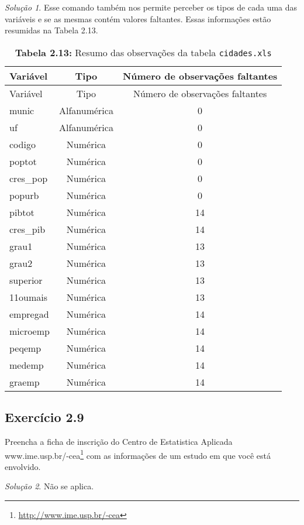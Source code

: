 \documentclass[
]{latex/krantz}
\renewcommand{\href}[2]{#2\footnote{\url{#1}}}
\theoremstyle{definition}
\theoremstyle{definition}
\theoremstyle{definition}
\theoremstyle{definition}
\theoremstyle{remark}
\newtheorem*{solution}{Solução}
\begin{document}
\begin{solution}
Esse comando também nos permite perceber os tipos de cada uma das variáveis e se as mesmas contém valores faltantes. Essas informações estão resumidas na Tabela 2.13.

\begin{longtable}[]{@{}lcc@{}}
\caption{\textbf{Tabela 2.13:} Resumo das observações da tabela \texttt{cidades.xls}}\tabularnewline
\toprule\noalign{}
Variável & Tipo & Número de observações faltantes \\
\midrule\noalign{}
\endfirsthead
\toprule\noalign{}
Variável & Tipo & Número de observações faltantes \\
\midrule\noalign{}
\endhead
\bottomrule\noalign{}
\endlastfoot
munic & Alfanumérica & 0 \\
uf & Alfanumérica & 0 \\
codigo & Numérica & 0 \\
poptot & Numérica & 0 \\
cres\_pop & Numérica & 0 \\
popurb & Numérica & 0 \\
pibtot & Numérica & 14 \\
cres\_pib & Numérica & 14 \\
grau1 & Numérica & 13 \\
grau2 & Numérica & 13 \\
superior & Numérica & 13 \\
11oumais & Numérica & 13 \\
empregad & Numérica & 14 \\
microemp & Numérica & 14 \\
peqemp & Numérica & 14 \\
medemp & Numérica & 14 \\
graemp & Numérica & 14 \\
\end{longtable}

\end{solution}

\hypertarget{exr2-9}{%
\subsection*{Exercício 2.9}\label{exr2-9}}

Preencha a ficha de inscrição do Centro de Estatistica Aplicada \href{http://www.ime.usp.br/-cea}{www.ime.usp.br/-cea} com as informações de um estudo em que você está envolvido.

\begin{solution}
Não se aplica.
\end{solution}
\end{document}
